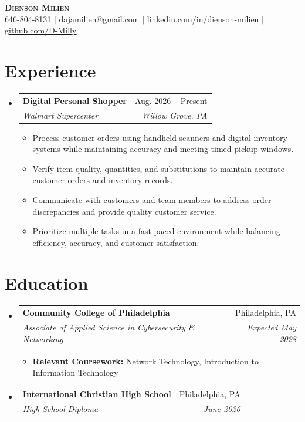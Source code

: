 \documentclass[letterpaper,11pt]{article}
\makeatletter
\newcommand{\resumeItem}[1]{
  \item\small{
    {#1 \vspace{-2pt}}
  }
}
\newcommand{\resumeSubheading}[4]{
  \vspace{-2pt}\item
    \begin{tabular*}{0.97\textwidth}[t]{l@{\extracolsep{\fill}}r}
      \textbf{#1} & #2 \\
      \textit{\small#3} & \textit{\small #4} \\
    \end{tabular*}\vspace{-7pt}
}
\newcommand{\resumeSubHeadingListStart}{\begin{itemize}[leftmargin=0.15in, label={}]}
\newcommand{\resumeSubHeadingListEnd}{\end{itemize}}
\newcommand{\resumeItemListStart}{\begin{itemize}}
\newcommand{\resumeItemListEnd}{\end{itemize}\vspace{-5pt}}
\makeatother
\begin{document}
\begin{center}
    \textbf{\Huge \scshape Dienson Milien} \\ \vspace{1pt}
    \small 646-804-8131 $|$ \href{mailto:dajamilien@gmail.com}{\underline{dajamilien@gmail.com}} $|$
    \href{https://www.linkedin.com/in/dienson-milien-b5590b42a/}{\underline{linkedin.com/in/dienson-milien}} $|$
    \href{https://github.com/D-Milly}{\underline{github.com/D-Milly}}
\end{center}

\section{Experience}
  \resumeSubHeadingListStart

    \resumeSubheading
      {Digital Personal Shopper}{Aug. 2026 -- Present}
      {Walmart Supercenter}{Willow Grove, PA}
      \resumeItemListStart
        \resumeItem{Process customer orders using handheld scanners and digital inventory systems while maintaining accuracy and meeting timed pickup windows.}
        \resumeItem{Verify item quality, quantities, and substitutions to maintain accurate customer orders and inventory records.}
        \resumeItem{Communicate with customers and team members to address order discrepancies and provide quality customer service.}
        \resumeItem{Prioritize multiple tasks in a fast-paced environment while balancing efficiency, accuracy, and customer satisfaction.}
      \resumeItemListEnd

  \resumeSubHeadingListEnd

\section{Education}
  \resumeSubHeadingListStart
    \resumeSubheading
      {Community College of Philadelphia}{Philadelphia, PA}
      {Associate of Applied Science in Cybersecurity \& Networking}{Expected May 2028}
      \resumeItemListStart
        \resumeItem{\textbf{Relevant Coursework:} Network Technology, Introduction to Information Technology}
      \resumeItemListEnd
    \resumeSubheading
      {International Christian High School}{Philadelphia, PA}
      {High School Diploma}{June 2026}
  \resumeSubHeadingListEnd

\end{document}
